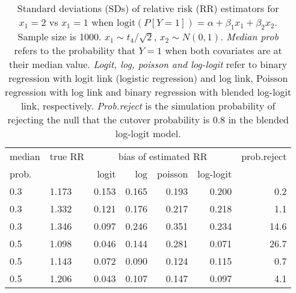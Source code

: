 \documentclass[12pt,a4paper]{article}
\begin{document}
\begin{table}[H] 
\small\sf\centering 
\caption{Standard deviations (SDs) of relative risk (RR) estimators for $x_1=2$ vs $x_1=1$ when $\mbox{logit}(P[Y=1])=\alpha+\beta_1 x_1 + \beta_2 x_2$. Sample size is 1000. $x_1 \sim $$t_4/\sqrt{2}$, $x_2 \sim N(0,1)$. {\it Median prob} refers to the probability that $Y=1$ when both covariates are at their median value. {\it Logit, log, poisson and log-logit} refer to binary regression with logit link (logistic regression) and log link, Poisson regression with log link and binary regression with blended log-logit link, respectively. {\it Prob.reject} is the simulation probability of rejecting the null that the cutover probability is $0.8$ in the blended log-logit model.} 
\begin{tabular}{llrrrrr} 
\toprule 
median & true RR & \multicolumn{4}{c}{bias of estimated RR} & prob.reject \\ 
prob. & & logit & log & poisson & log-logit  & \\ \midrule 
0.3 & 1.173 & 0.153 & 0.165 & 0.193 & 0.200 &  0.2 \\  
0.3 & 1.332 & 0.121 & 0.176 & 0.217 & 0.218 &  1.1 \\  
0.3 & 1.346 & 0.097 & 0.246 & 0.351 & 0.234 & 14.6 \\  
0.5 & 1.098 & 0.046 & 0.144 & 0.281 & 0.071 & 26.7 \\  
0.5 & 1.143 & 0.072 & 0.090 & 0.124 & 0.115 &  0.7 \\  
0.5 & 1.206 & 0.043 & 0.107 & 0.147 & 0.097 &  4.1 \\  
\bottomrule 
\end{tabular} 
\end{table} 
\end{document}
